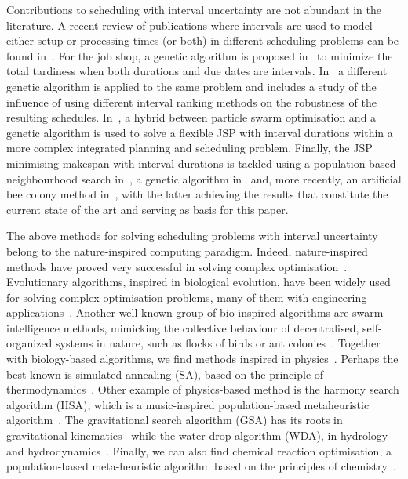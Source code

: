 \documentclass[icae]{iosart2x}
\newcommand{\reviewed}[1]{#1} %
\begin{document}
Contributions to scheduling with interval uncertainty are not abundant in the literature. A recent review of publications where intervals are used to model either setup or processing times (or both) in different scheduling problems can be found in~\citep{Allahverdi2022}. For the job shop, a genetic algorithm is proposed in~\cite{Lei2012c} to minimize the total tardiness when both durations and due dates are intervals. In~\cite{Diaz2020} a different genetic algorithm is applied to the same problem and \cite{Diaz2022robust} includes a study of the influence of using different interval ranking methods on the robustness of the resulting schedules. In~\cite{Li2019}, a hybrid between particle swarm optimisation and a genetic algorithm is used to solve a flexible JSP with interval durations within a more complex integrated planning and scheduling problem. Finally, the JSP minimising makespan with interval durations is tackled using a population-based neighbourhood search in~\cite{Lei2011}, a genetic algorithm in~\cite{Diaz2020genetic} and, more recently, an artificial bee colony method in~\cite{Diaz2022}, with the latter achieving the results that constitute the current state of the art and serving as basis for this paper.

\reviewed{The above methods for solving scheduling problems with interval uncertainty belong to the nature-inspired computing paradigm.  Indeed, } nature-inspired methods have proved very successful in solving complex optimisation~\cite{Siddique2015}. \reviewed{Evolutionary algorithms, inspired in biological evolution,  have been widely used for solving complex optimisation problems, many of them with engineering applications~\cite{Slowik2020evolutionary}. Another well-known group of bio-inspired algorithms are swarm intelligence methods,  mimicking the collective behaviour of decentralised, self-organized systems in nature, such as flocks of birds or ant colonies~\cite{Slowik2018nature}. Together with biology-based algorithms, we find methods inspired in physics~\cite{Siddique2016physics}.  Perhaps the best-known is simulated annealing (SA),  based on the principle of thermodynamics~\cite{Siddique2016b}. Other example of physics-based method is the harmony search algorithm (HSA), which is a music-inspired population-based metaheuristic algorithm~\cite{Siddique2015harmony}.  The gravitational search algorithm (GSA) has its roots in gravitational kinematics~\cite{Siddique2016gravitational} while the water drop algorithm (WDA), in hydrology and hydrodynamics~\cite{Siddique2014water}. Finally, we can also find chemical reaction optimisation, a population-based meta-heuristic algorithm based on the principles of chemistry~\cite{Siddique2017nature}}.
\end{document}
